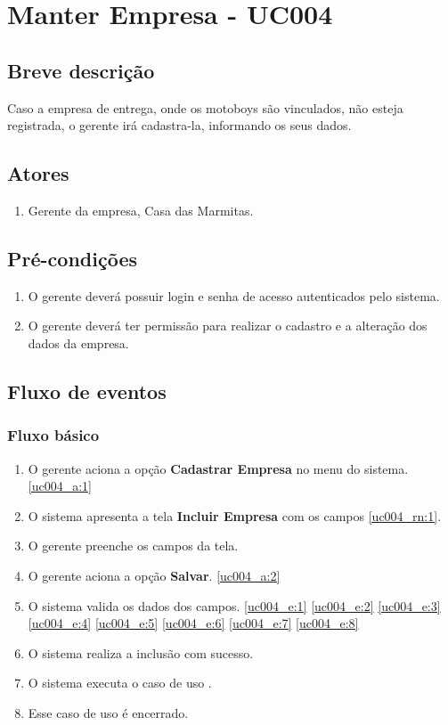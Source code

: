 \chapter{Manter Empresa - UC004} \label{uc004}

\section{Breve descrição}

Caso a empresa de entrega, onde os motoboys são vinculados, não esteja registrada, o gerente irá cadastra-la, informando os seus dados.

\section{Atores}

\begin{enumerate}
	\item Gerente da empresa, Casa das Marmitas.
\end{enumerate}

\section{Pré-condições}

\begin{enumerate}
	\item O gerente deverá possuir login e senha de acesso autenticados pelo sistema.
	\item O gerente deverá ter permissão para realizar o cadastro e a alteração dos dados da empresa.
\end{enumerate}

\section{Fluxo de eventos}

\subsection{Fluxo básico}

\begin{enumerate}[label=P\arabic*]
	\item O gerente aciona a opção \textbf{Cadastrar Empresa} no menu do sistema. \label{uc004_p:1}\ref{uc004_a:1}
	\item O sistema apresenta a tela \textbf{Incluir Empresa} com os campos \ref{uc004_rn:1}. \label{uc004_p:2}
	\item O gerente preenche os campos da tela. \label{uc004_p:3}
	\item O gerente aciona a opção \textbf{Salvar}. \label{uc004_p:4}\ref{uc004_a:2}
	\item O sistema valida os dados dos campos. \ref{uc004_e:1} \ref{uc004_e:2} \ref{uc004_e:3} \ref{uc004_e:4} \ref{uc004_e:5} \ref{uc004_e:6} \ref{uc004_e:7} \ref{uc004_e:8}
	\item O sistema realiza a inclusão com sucesso.
	\item O sistema executa o caso de uso .
	\item Esse caso de uso é encerrado.	
\end{enumerate}

